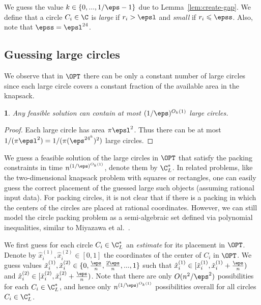 \documentclass[10pt,a4paper]{article}
\theoremstyle{plain}
\theoremstyle{plain}
\theoremstyle{plain}
\newtheorem{prop}[theorem]{\protect\propositionname}
\theoremstyle{definition}
\providecommand{\propositionname}{Proposition}
\begin{document}
{We guess the value $k\in\{0,...,1/\eps-1\}$ due to Lemma~\ref{lem:create-gap}.
We define that a circle $C_{i}\in\C$ is \emph{large }if $r_{i}>\epsl$
and \emph{small} if $r_{i}\leqslant\epss$. Also, note that $\epss = \epsl^{24}$. 

\subsection{Guessing large circles} \label{subsec:Large_Guess}

We observe that in $\OPT$ there can be only a constant number of
large circles since each large circle covers a constant fraction of the
available area in the knapsack. 
\begin{prop}
\label{big_sol} Any feasible solution
	can contain at most $(1/\eps)^{O_k(1)}$ large circles. 
	\end{prop}

\begin{proof}
	Each large circle has area $\pi \epsl^2$. Thus there can be at most $1/(\pi \epsl^2)= 1/(\pi ({\eps^{{24}^k})^2})$ large circles. 
\end{proof}

We guess a feasible solution of the large circles in $\OPT$ that satisfy the packing constraints in time $n^{(1/\eps)^{O_k(1)}}$,
denote them by $\C_{L}^{*}$. In related problems, like the two-dimensional
knapsack problem with squares or rectangles, one can easily guess
the correct placement of the guessed large such objects  
(assuming rational input data).
For packing circles, it is not clear that if there is a packing in which the
centers of the circles are placed at rational coordinates.
{However, we can still model the circle packing problem as a semi-algebraic set defined via polynomial inequalities, similar to Miyazawa et al.~\cite{MiyazawaPSSW16}.}


We first guess for each circle $C_{i}\in\C_{L}^{*}$
an \emph{estimate }for its placement in $\OPT$. Denote by $\hat{x}_{i}^{(1)},\hat{x}_{i}^{(2)}\in[0,1]$
the coordinates of the center of $C_{i}$ in $\OPT$. We guess values
$\tilde{x}_{i}^{(1)},\tilde{x}_{i}^{(2)}\in\{0,\frac{\eps}{n},\frac{2\eps}{n},...,1\}$
such that $\hat{x}_{i}^{(1)}\in[\tilde{x}_{i}^{(1)},\tilde{x}_{i}^{(1)}+\frac{\eps}{n})$
and $\hat{x}_{i}^{(2)}\in[\tilde{x}_{i}^{(2)},\tilde{x}_{i}^{(2)}+\frac{\eps}{n})$.
Note that there are only $O(n^{2}/\eps^{2})$ possibilities for
each $C_{i}\in\C_{L}^{*}$, and hence only $n^{(1/\eps)^{O_k(1)}}$
possibilities overall for all circles $C_{i}\in\C_{L}^{*}$.

}
\end{document}
